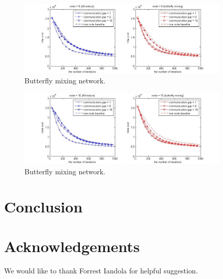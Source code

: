 \documentclass{article}
\begin{document}
\begin{figure}
  
  \centering
    \includegraphics[width=0.9\textwidth]{batch20_node8_fixIter.jpg}
    \caption{Butterfly mixing network.}
\end{figure}
\begin{figure}
  
  \centering
    \includegraphics[width=0.9\textwidth]{batch20_node16_fixIter.jpg}
    \caption{Butterfly mixing network.}
\end{figure}

\section{Conclusion}


\section{Acknowledgements}
We would like to thank Forrest Iandola for helpful suggestion.



\end{document}
